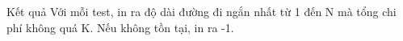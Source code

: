 Kết quả
Với mỗi test, in ra độ dài đường đi ngắn nhất từ 1 đến N mà tổng chi phí không quá K. Nếu không tồn tại, in ra -1.
